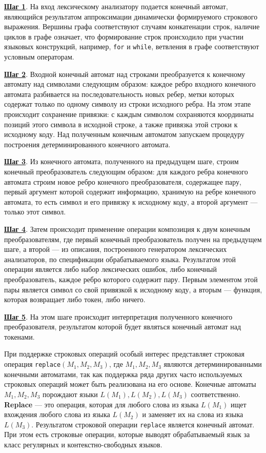 \documentclass{matmex-diploma}
\begin{document}
\textbf{\underline{Шаг 1}}. На вход лексическому анализатору подается конечный автомат, являющийся результатом аппроксимации динамически формируемого строкового выражения. Вершины графа соответствуют случаям конкатенации строк, наличие циклов в графе означает, что формирование строк происходило при участии языковых конструкций, например, \verb|for| и \verb|while|, ветвления в графе соответствуют условным операторам.  

\textbf{\underline{Шаг 2}}. Входной конечный автомат над строками преобразуется к конечному автомату над символами следующим образом: каждое ребро входного конечного автомата разбивается на последовательность новых ребер, метки которых содержат только по одному символу из строки исходного ребра. На этом этапе происходит сохранение привязки: с каждым символом сохраняются координаты позиций этого символа в исходной строке, а также привязка этой строки к исходному коду. Над полученным конечным автоматом запускаем процедуру построения детерминированного конечного автомата. 

\textbf{\underline{Шаг 3}}. Из конечного автомата, полученного на предыдущем шаге, строим конечный преобразователь следующим образом: для каждого ребра конечного автомата строим новое ребро конечного преобразователя, содержащее пару, первый аргумент которой содержит информацию, хранимую на ребре конечного автомата, то есть символ и его привязку к исходному коду, а второй аргумент {---} только этот символ.

\textbf{\underline{Шаг 4}}. Затем происходит применение операции композиция к двум конечным преобразователям, где первый конечный преобразователь получен на предыдущем шаге, а второй {---} из описания, построенного генератором лексических анализаторов, по спецификации обрабатываемого языка. Результатом этой операции является либо набор лексических ошибок, либо конечный преобразователь, каждое ребро которого содержит пару. Первым элементом этой пары является символ со свой привязкой к исходному коду, а вторым {---} функция, которая возвращает либо токен, либо ничего.

\textbf{\underline{Шаг 5}}. На этом шаге происходит интерпретация полученного конечного преобразователя, результатом которой будет являться конечный автомат над токенами.

\vspace{20.5}

При поддержке строковых операций особый интерес представляет строковая операция \verb|replace|$(M_1, M_2, M_3)$, где $M_1, M_2, M_3$ являются детерминированными конечными автоматами, так как поддержка ряда других часто используемых строковых операций может быть реализована на его основе. Конечные автоматы $M_1, M_2, M_3$ порождают языки $L(M_1), L(M_2), L(M_3)$ соответственно. \textbf{Replace} --- это операция, которая для любого слова из языка $L(M_1)$ ищет вхождения любого слова из языка $L(M_2)$ и заменяет их на слова из языка $L(M_3)$. Результатом строковой операции \verb|replace| является конечный автомат. При этом есть строковые операции, которые выводят обрабатываемый язык за класс регулярных и контекстно-свободных языков. 
\end{document}
